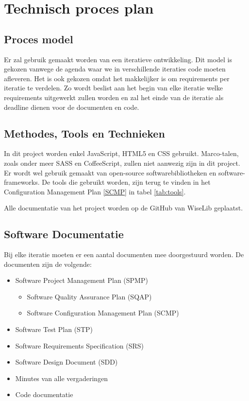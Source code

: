 \section{Technisch proces plan}

\subsection{Proces model}

Er zal gebruik gemaakt worden van een iteratieve ontwikkeling. Dit model is gekozen vanwege de agenda waar we in verschillende iteraties code moeten afleveren. Het is ook gekozen omdat het makkelijker is om requirements per iteratie te verdelen. Zo wordt beslist aan het begin van elke iteratie welke requirements uitgewerkt zullen worden en zal het einde van de iteratie als deadline dienen voor de documenten en code.

\subsection{Methodes, Tools en Technieken}

In dit project worden enkel JavaScript, HTML5 en CSS  gebruikt. Marco-talen, zoals onder meer SASS en CoffeeScript, zullen niet aanwezig zijn in dit project. Er wordt wel gebruik gemaakt van open-source softwarebibliotheken en software-frameworks. De tools die gebruikt worden, zijn terug te vinden in het Configuration Management Plan \ref{SCMP} in tabel \ref{tab:tools}.

Alle documentatie van het project worden op de GitHub \cite{GitHub} van WiseLib geplaatst.

\subsection{Software Documentatie}

Bij elke iteratie moeten er een aantal documenten mee doorgestuurd worden. \newline
De documenten zijn de volgende:

\begin{itemize}
\item Software Project Management Plan (SPMP)
\begin{itemize}
\item Software Quality Assurance Plan (SQAP)
\item Software Configuration Management Plan (SCMP)
\end{itemize}

\item Software Test Plan (STP)
\item Software Requirements Specification (SRS)
\item Software Design Document (SDD)
\item Minutes van alle vergaderingen 
\item Code documentatie 
\end{itemize}


